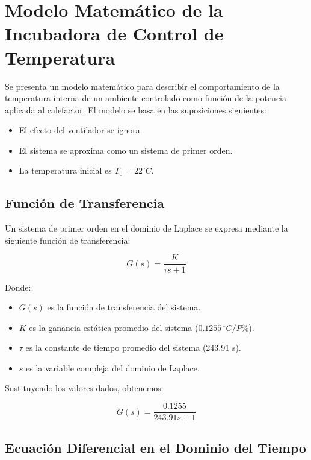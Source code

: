 \documentclass[spanish, a4paper, 11pt]{article}
\begin{document}
\newpage
\section{Modelo Matemático de la Incubadora de Control de Temperatura}  

Se presenta un modelo matemático para describir el comportamiento de la temperatura interna de un ambiente controlado como función de la potencia aplicada al calefactor. El modelo se basa en las suposiciones siguientes:

\begin{itemize}
    \item El efecto del ventilador se ignora.
    \item El sistema se aproxima como un sistema de primer orden.
    \item La temperatura inicial es \(T_0 = 22^\circ C\).
\end{itemize}

\subsection{Función de Transferencia}

Un sistema de primer orden en el dominio de Laplace se expresa mediante la siguiente función de transferencia:

\begin{equation}
    G(s) = \frac{K}{\tau s + 1}
\end{equation}

Donde:
\begin{itemize}
    \item \(G(s)\) es la función de transferencia del sistema.
    \item \(K\) es la ganancia estática promedio del sistema (\(0.1255 \, ^\circ C / P\%\)).
    \item \(\tau\) es la constante de tiempo promedio del sistema (243.91 s).
    \item \(s\) es la variable compleja del dominio de Laplace.
\end{itemize}

Sustituyendo los valores dados, obtenemos:

\begin{equation}
    G(s) = \frac{0.1255}{243.91 s + 1}
\end{equation}

\subsection{Ecuación Diferencial en el Dominio del Tiempo}
\end{document}
